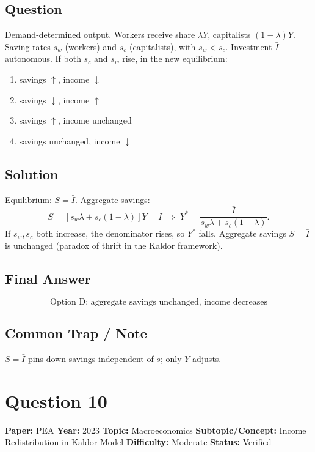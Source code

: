 \documentclass[11pt]{article}
\begin{document}
\subsection*{Question}
Demand-determined output. Workers receive share $\lambda Y$, capitalists $(1-\lambda)Y$. Saving rates $s_w$ (workers) and $s_c$ (capitalists), with $s_w<s_c$. Investment $\bar I$ autonomous. If both $s_c$ and $s_w$ rise, in the new equilibrium:
\begin{enumerate}[label=(\Alph*)]
\item savings $\uparrow$, income $\downarrow$
\item savings $\downarrow$, income $\uparrow$
\item savings $\uparrow$, income unchanged
\item savings unchanged, income $\downarrow$
\end{enumerate}

\subsection*{Solution}
Equilibrium: $S=\bar I$. Aggregate savings:
\[
S=[s_w\lambda+s_c(1-\lambda)]Y=\bar I \;\Longrightarrow\; Y^*=\frac{\bar I}{s_w\lambda+s_c(1-\lambda)}.
\]
If $s_w,s_c$ both increase, the denominator rises, so $Y^*$ falls. Aggregate savings $S=\bar I$ is unchanged (paradox of thrift in the Kaldor framework).

\subsection*{Final Answer}
\[
\boxed{\text{Option D: aggregate savings unchanged, income decreases}}
\]

\subsection*{Common Trap / Note}
$S=\bar I$ pins down savings independent of $s$; only $Y$ adjusts.

\medskip

\section*{Question 10}
\textbf{Paper:} PEA \quad \textbf{Year:} 2023 \quad \textbf{Topic:} Macroeconomics \quad \textbf{Subtopic/Concept:} Income Redistribution in Kaldor Model \quad \textbf{Difficulty:} Moderate \quad \textbf{Status:} Verified
\end{document}
